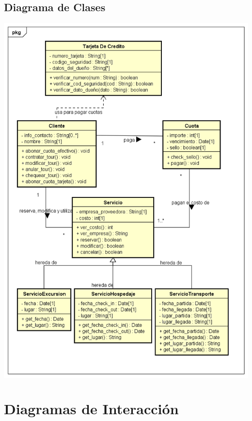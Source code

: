 \documentclass[12pt,a4paper]{article}
\begin{document}
	\subsection{Diagrama de Clases}
		\includegraphics[scale=0.7]{diagramaDeClases.png}

\section{Diagramas de Interacción}
\end{document}
